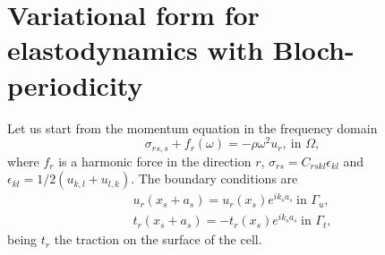 \section{Variational form for elastodynamics with Bloch-periodicity}
Let us start from the momentum equation in the frequency domain
\[\sigma_{rs,s}+f_{r}(\omega) = -\rho \omega^2 u_r,\ \text{in } \Omega,\]
where $f_r$ is a harmonic force in the direction $r$, $\sigma_{rs}=C_{rskl}\epsilon_{kl}$ and $\epsilon_{kl} =1/2(u_{k,l} + u_{l,k})$. The boundary conditions are
\begin{subequations}
\begin{align}
u_r(x_s +a_s)=u_r(x_s)e^{i k_s a_s}\ \text{in } \Gamma_u, \label{eq:disp_bloch}\\
t_r(x_s +a_s)=-t_r(x_s)e^{i k_s a_s}\ \text{in } \Gamma_t, \label{eq:force_bloch}
\end{align}
\label{eq:bloch_cond}
\end{subequations}
being $t_{r}$ the traction on the surface of the cell.

